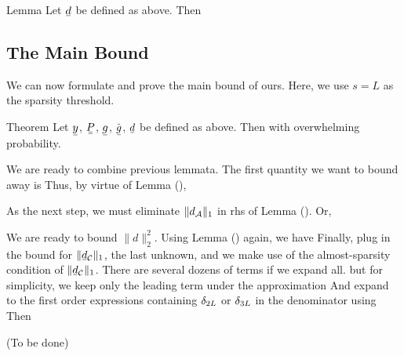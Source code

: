 \Result
{Lemma}
{
Let \(\V{d}\) be defined as above.
Then
%
%
}

\subsection{The Main Bound}

We can now formulate and prove the main bound of ours.
Here, we use \(s=L\) as the sparsity threshold.

\Result
{Theorem}
{
Let \(\V{y}\), \(\M{P}\), \(\V{g}\), \(\hat{\V{g}}\), \(\V{d}\) be defined as above.
Then
with overwhelming probability.
}

We are ready to combine previous lemmata.
The first quantity we want to bound away is
Thus, by virtue of Lemma (),

As the next step, we must eliminate \(\|d_{\mathcal{A}}\|_1\) in rhs of Lemma ().
Or,

We are ready to bound \(\| d \|_2^2\).
Using Lemma () again, we have
Finally, plug in the bound for \(\|\V{d}_{\MC{C}}\|_1\), the last unknown, and we make use of the almost-sparsity condition of \(\|\V{d}_{\MC{C}}\|_1\).
There are several dozens of terms if we expand all.
but for simplicity, we keep only the leading term under the approximation
And expand to the first order expressions containing \(\delta_{2L}\) or \(\delta_{3L}\) in the denominator using
Then



{ \color{red} (To be done) }
